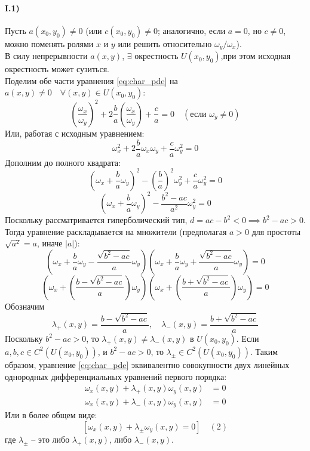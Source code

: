 \documentclass[12pt, a4paper]{article}
\begin{document}
\paragraph{I.1)} Пусть $a(x_0, y_0) \neq 0$ (или $c(x_0, y_0) \neq 0$; аналогично, если $a=0$, но $c \neq 0$, можно поменять ролями $x$ и $y$ или решить относительно $\omega_y/\omega_x$). \\
В силу непрерывности $a(x,y)$, $\exists$ окрестность $U(x_0, y_0)$,при этом исходная окрестность может сузиться. \\
Поделим обе части уравнения \eqref{eq:char_pde} на $a(x,y) \neq 0 \quad \forall (x,y) \in U(x_0, y_0)$:
\[
\left(\frac{\omega_x}{\omega_y}\right)^2 + 2\frac{b}{a}\left(\frac{\omega_x}{\omega_y}\right) + \frac{c}{a} = 0 \quad (\text{если } \omega_y \neq 0)
\]
Или, работая с исходным уравнением:
\[
\omega_x^2 + 2\frac{b}{a}\omega_x\omega_y + \frac{c}{a}\omega_y^2 = 0
\]
Дополним до полного квадрата:
\[
\left(\omega_x + \frac{b}{a}\omega_y\right)^2 - \left(\frac{b}{a}\right)^2\omega_y^2 + \frac{c}{a}\omega_y^2 = 0
\]
\[
\left(\omega_x + \frac{b}{a}\omega_y\right)^2 - \frac{b^2-ac}{a^2}\omega_y^2 = 0
\]
Поскольку рассматривается гиперболический тип, $d = ac-b^2 < 0 \implies b^2-ac > 0$.
Тогда уравнение раскладывается на множители (предполагая $a>0$ для простоты $\sqrt{a^2}=a$, иначе $|a|$):
\[
\left( \omega_x + \frac{b}{a}\omega_y - \frac{\sqrt{b^2-ac}}{a}\omega_y \right) \left( \omega_x + \frac{b}{a}\omega_y + \frac{\sqrt{b^2-ac}}{a}\omega_y \right) = 0
\]
\[
\left( \omega_x + \left(\frac{b - \sqrt{b^2-ac}}{a}\right)\omega_y \right) \left( \omega_x + \left(\frac{b + \sqrt{b^2-ac}}{a}\right)\omega_y \right) = 0
\]
Обозначим
\[ \lambda_+(x,y) = \frac{b - \sqrt{b^2-ac}}{a}, \quad \lambda_-(x,y) = \frac{b + \sqrt{b^2-ac}}{a} \]
Поскольку $b^2-ac > 0$, то $\lambda_+(x,y) \neq \lambda_-(x,y)$ в $U(x_0,y_0)$.
Если $a,b,c \in C^2(U(x_0,y_0))$, и $b^2-ac > 0$, то $\lambda_\pm \in C^2(U(x_0,y_0))$.
Таким образом, уравнение \eqref{eq:char_pde} эквивалентно совокупности двух линейных однородных дифференциальных уравнений первого порядка:
\begin{align}
\omega_x(x,y) + \lambda_+(x,y)\omega_y(x,y) &= 0 \label{eq:char_ode1_pde_form} \\
\omega_x(x,y) + \lambda_-(x,y)\omega_y(x,y) &= 0 \label{eq:char_ode2_pde_form}
\end{align}
Или в более общем виде:
\begin{equation} \label{eq:char_pde_factor_generic}
[\omega_x(x,y) + \lambda_\pm\omega_y(x,y) = 0] \quad (2)
\end{equation}
где $\lambda_\pm$ -- это либо $\lambda_+(x,y)$, либо $\lambda_-(x,y)$.
\end{document}
